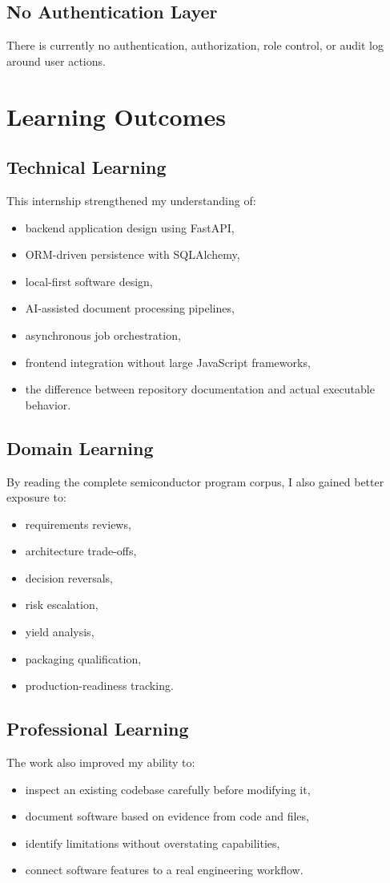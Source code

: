 \documentclass[12pt, a4paper]{article}
\begin{document}
\subsection{No Authentication Layer}
There is currently no authentication, authorization, role control, or audit log around user actions.

\section{Learning Outcomes}
\subsection{Technical Learning}
This internship strengthened my understanding of:
\begin{itemize}
\item backend application design using FastAPI,
\item ORM-driven persistence with SQLAlchemy,
\item local-first software design,
\item AI-assisted document processing pipelines,
\item asynchronous job orchestration,
\item frontend integration without large JavaScript frameworks,
\item the difference between repository documentation and actual executable behavior.
\end{itemize}

\subsection{Domain Learning}
By reading the complete semiconductor program corpus, I also gained better exposure to:
\begin{itemize}
\item requirements reviews,
\item architecture trade-offs,
\item decision reversals,
\item risk escalation,
\item yield analysis,
\item packaging qualification,
\item production-readiness tracking.
\end{itemize}

\subsection{Professional Learning}
The work also improved my ability to:
\begin{itemize}
\item inspect an existing codebase carefully before modifying it,
\item document software based on evidence from code and files,
\item identify limitations without overstating capabilities,
\item connect software features to a real engineering workflow.
\end{itemize}
\end{document}
